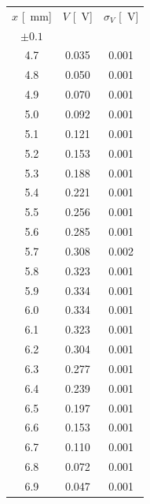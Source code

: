 \documentclass[10pt,oneside,a4paper]{article}
\begin{document}
\begin{minipage}{0.33\linewidth}
\begin{center}
\begin{tabular}{c|c|c}
$x$ [\SI{}{mm}] & $V$ [\SI{}{V}] & $\sigma_V$ [\SI{}{V}] \\
 $\pm 0.1$ & & \\
\hline
  4.7 & 0.035 & 0.001 \\
  4.8 & 0.050 & 0.001 \\
  4.9 & 0.070 & 0.001 \\
  5.0 & 0.092 & 0.001 \\
  5.1 & 0.121 & 0.001 \\
  5.2 & 0.153 & 0.001 \\
  5.3 & 0.188 & 0.001 \\
  5.4 & 0.221 & 0.001 \\
  5.5 & 0.256 & 0.001 \\
  5.6 & 0.285 & 0.001 \\
  5.7 & 0.308 & 0.002 \\
  5.8 & 0.323 & 0.001 \\
  5.9 & 0.334 & 0.001 \\
  6.0 & 0.334 & 0.001 \\
  6.1 & 0.323 & 0.001 \\
  6.2 & 0.304 & 0.001 \\
  6.3 & 0.277 & 0.001 \\
  6.4 & 0.239 & 0.001 \\
  6.5 & 0.197 & 0.001 \\
  6.6 & 0.153 & 0.001 \\
  6.7 & 0.110 & 0.001 \\
  6.8 & 0.072 & 0.001 \\
  6.9 & 0.047 & 0.001 \\
\hline
\end{tabular}
\end{center}
\end{minipage}
\end{document}

